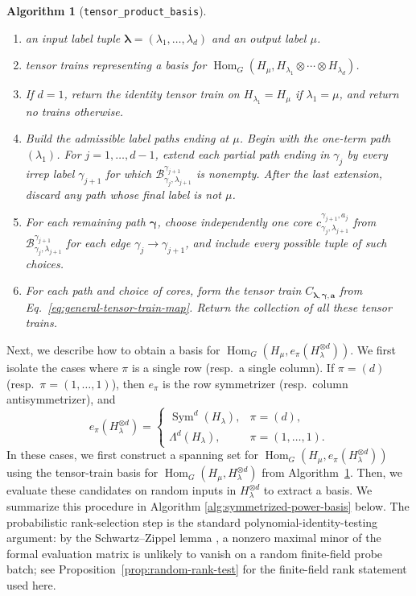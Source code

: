 \documentclass[11pt]{article}
\newcommand{\scB}{\mathcal{B}}
\newcommand{\HomG}[2]{\operatorname{Hom}_G\!\left(#1,#2\right)}
\newcommand{\Sym}{\operatorname{Sym}}
\newtheorem{algorithm}[theorem]{Algorithm}
\theoremstyle{definition}
\begin{document}
\begin{algorithm}[\texttt{tensor\_product\_basis}]\label{alg:tensor-product-basis}
  \phantom{}
  \begin{enumerate}[label=\textbf{Step \arabic*.},leftmargin=2.8cm]
    \item[\textbf{Input:}] an input label tuple $\boldsymbol{\lambda}=(\lambda_1,\dots,\lambda_d)$ and an output label $\mu$.
    \item[\textbf{Output:}] tensor trains representing a basis for $\HomG{H_\mu}{H_{\lambda_1}\otimes\cdots\otimes H_{\lambda_d}}$.
    \item If $d=1$, return the identity tensor train on $H_{\lambda_1}=H_\mu$ if $\lambda_1=\mu$, and return no trains otherwise.
    \item Build the admissible label paths ending at $\mu$.
    Begin with the one-term path $(\lambda_1)$.
    For $j=1,\dots,d-1$, extend each partial path ending in $\gamma_j$ by every irrep label $\gamma_{j+1}$ for which $\scB_{\gamma_j,\lambda_{j+1}}^{\gamma_{j+1}}$ is nonempty.
    After the last extension, discard any path whose final label is not $\mu$.
    \item For each remaining path $\boldsymbol{\gamma}$, choose independently one core $c_{\gamma_j,\lambda_{j+1}}^{\gamma_{j+1},a_j}$ from $\scB_{\gamma_j,\lambda_{j+1}}^{\gamma_{j+1}}$ for each edge $\gamma_j\to\gamma_{j+1}$, and include every possible tuple of such choices.
    \item For each path and choice of cores, form the tensor train $C_{\boldsymbol{\lambda},\boldsymbol{\gamma},\boldsymbol{a}}$ from Eq.~\eqref{eq:general-tensor-train-map}.
    Return the collection of all these tensor trains.
  \end{enumerate}
\end{algorithm}

Next, we describe how to obtain a basis for $\HomG{H_\mu}{e_\pi(H_\lambda^{\otimes d})}$.
We first isolate the cases where $\pi$ is a single row (resp.~a single column).
If $\pi=(d)$ (resp.~$\pi=(1,\dots,1)$), then $e_\pi$ is the row symmetrizer (resp.~column antisymmetrizer), and
\[
  e_\pi(H_\lambda^{\otimes d})
  =
  \begin{cases}
    \Sym^d(H_\lambda), & \pi=(d),\\
    \Lambda^d(H_\lambda), & \pi=(1,\dots,1).
  \end{cases}
\]
In these cases, we first construct a spanning set for $\HomG{H_\mu}{e_\pi(H_\lambda^{\otimes d})}$ using the tensor-train basis for $\HomG{H_\mu}{H_\lambda^{\otimes d}}$ from Algorithm~\ref{alg:tensor-product-basis}.
Then, we evaluate these candidates on random inputs in $H_\lambda^{\otimes d}$ to extract a basis.
We summarize this procedure in Algorithm \ref{alg:symmetrized-power-basis} below.
The probabilistic rank-selection step is the standard polynomial-identity-testing argument: by the Schwartz--Zippel lemma \cite{Schwartz1980,Zippel1979}, a nonzero maximal minor of the formal evaluation matrix is unlikely to vanish on a random finite-field probe batch; see Proposition~\ref{prop:random-rank-test} for the finite-field rank statement used here.
\end{document}
